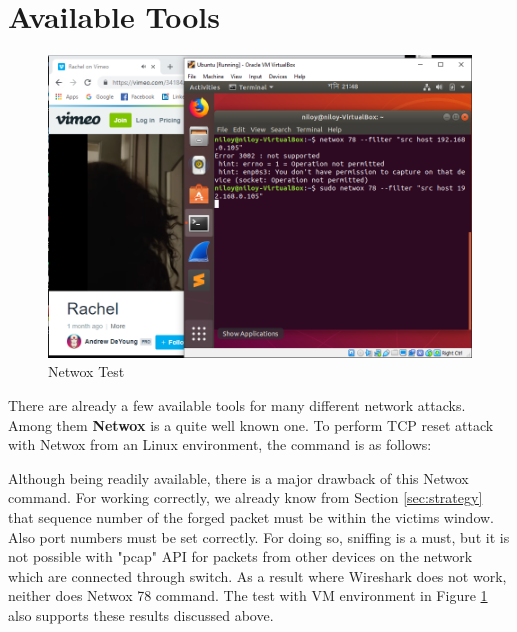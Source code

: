 \documentclass[14pt]{extarticle}
\begin{document}
\section{Available Tools}
    \label{sec:netwox}
    
    \begin{figure}[!h]
    	\centering
    	\includegraphics[width=.95\textwidth]{Pictures/Design/Netwox_test.png}
    	\caption{Netwox Test} 
    	\label{fig:netwox_test}
    \end{figure}
    
    There are already a few available tools for many different network attacks. Among them \textbf{Netwox} is a quite well known one. To perform TCP reset attack with Netwox from an Linux environment, the command is as follows:
    
    
    
    Although being readily available, there is a major drawback of this Netwox command. For working correctly, we already know from Section \ref{sec:strategy} that sequence number of the forged packet must be within the victims window. Also port numbers must be set correctly. For doing so, sniffing is a must, but it is not possible with "pcap" API for packets from other devices on the network which are connected through switch. As a result where Wireshark does not work, neither does Netwox 78 command. The test with VM environment in Figure \ref{fig:netwox_test} also supports these results discussed above.
    
\end{document}
